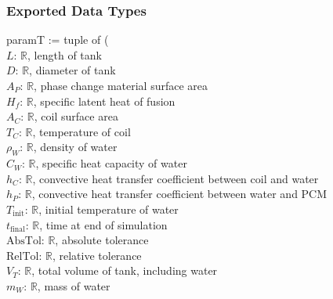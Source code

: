 \documentclass[12pt]{article}
\begin{document}

\subsubsection{Exported Data Types}

paramT := tuple of (\\
$L$: $\mathbb{R}$, length of tank\\
$D$: $\mathbb{R}$, diameter of tank\\
$A_P$: $\mathbb{R}$, phase change material surface area\\  
$H_f$: $\mathbb{R}$, specific latent heat of fusion\\
$A_C$: $\mathbb{R}$, coil surface area\\
$T_C$: $\mathbb{R}$, temperature of coil\\
$\rho_W$: $\mathbb{R}$, density of water\\
$C_W$: $\mathbb{R}$, specific heat capacity of water\\  
$h_C$: $\mathbb{R}$, convective heat transfer coefficient between coil and water\\
$h_P$: $\mathbb{R}$, convective heat transfer coefficient between water and PCM\\
$T_\text{init}$: $\mathbb{R}$, initial temperature of water \\%
$t_\text{final}$: $\mathbb{R}$, time at end of simulation\\
$\text{AbsTol}$: $\mathbb{R}$, absolute tolerance\\
$\text{RelTol}$: $\mathbb{R}$, relative tolerance\\
$V_T$: $\mathbb{R}$, total volume of tank, including water \\%
$m_W$: $\mathbb{R}$, mass of water\\
\end{document}
